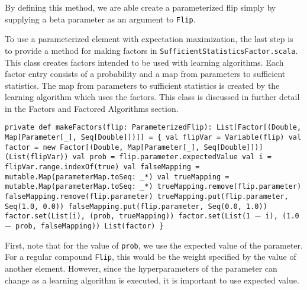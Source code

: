 By defining this method, we are able create a parameterized flip simply by supplying a beta parameter as an argument to \texttt{Flip}.

To use a parameterized element with expectation maximization, the last step is to provide a method for making factors in \texttt{SufficientStat\-isticsFactor.scala}. This class creates factors intended to be used with learning algorithms. Each factor entry consists of a probability and a map from parameters to sufficient statistics. The map from parameters to sufficient statistics is created by the learning algorithm which uses the factors. This class is discussed in further detail in the Factors and Factored Algorithms section.

\begin{flushleft}
\texttt{private def makeFactors(flip: ParameterizedFlip): List[Factor[(Double, Map[Parameter[\_], Seq[Double]])]] = \{
\newline 
\newline val flipVar = Variable(flip)
\newline val factor = new Factor[(Double, Map[Parameter[\_], Seq[Double]])](List(flipVar))
\newline val prob = flip.parameter.expectedValue 
\newline val i = flipVar.range.indexOf(true)
\newline 
\newline val falseMapping = mutable.Map(parameterMap.toSeq: \_*)
\newline val trueMapping = mutable.Map(parameterMap.toSeq: \_*)
\newline 
\newline trueMapping.remove(flip.parameter) falseMapping.remove(flip.parameter) \newline trueMapping.put(flip.parameter, Seq(1.0, 0.0)) \newline falseMapping.put(flip.parameter, Seq(0.0, 1.0)) factor.set(List(i), (prob, trueMapping)) 
\newline factor.set(List(1 $-$ i), (1.0 $-$ prob, falseMapping))
\newline List(factor)
\newline \}
}
\end{flushleft}

First, note that for the value of \texttt{prob}, we use the expected value of the parameter. For a regular compound \texttt{Flip}, this would be the weight specified by the value of another element. However, since the hyperparameters of the parameter can change as a learning algorithm is executed, it is important to use expected value.

